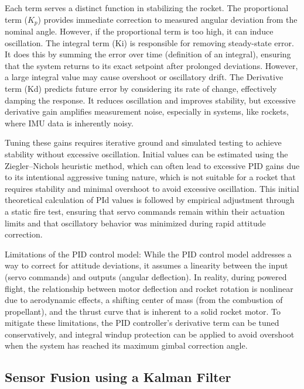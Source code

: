 Each term serves a distinct function in stabilizing the rocket. The proportional term ($K_p$) provides immediate correction to measured angular deviation from the nominal angle. However, if the proportional term is too high, it can induce oscillation. The integral term (Ki) is responsible for removing steady-state error. It does this by summing the error over time (definition of an integral), ensuring that the system returns to its exact setpoint after prolonged deviations. However, a large integral value may cause overshoot or oscillatory drift. The Derivative term (Kd) predicts future error by considering its rate of change, effectively damping the response. It reduces oscillation and improves stability, but excessive derivative gain amplifies measurement noise, especially in systems, like rockets, where IMU data is inherently noisy.

Tuning these gains requires iterative ground and simulated testing to achieve stability without excessive oscillation. Initial values can be estimated using the Ziegler–Nichols heuristic method, which can often lead to excessive PID gains due to its intentional aggressive tuning nature, which is not suitable for a rocket that requires stability and minimal overshoot to avoid excessive oscillation. This initial theoretical calculation of PId values is followed by empirical adjustment through a static fire test, ensuring that servo commands remain within their actuation limits and that oscillatory behavior was minimized during rapid attitude correction.

Limitations of the PID control model:
While the PID control model addresses a way to correct for attitude deviations, it assumes a linearity between the input (servo commands) and outputs (angular deflection). In reality, during powered flight, the relationship between motor deflection and rocket rotation is nonlinear due to aerodynamic effects, a shifting center of mass (from the combustion of propellant), and the thrust curve that is inherent to a solid rocket motor. To mitigate these limitations, the PID controller’s derivative term can be tuned conservatively, and integral windup protection can be applied to avoid overshoot when the system has reached its maximum gimbal correction angle.



\subsection{Sensor Fusion using a Kalman Filter}

